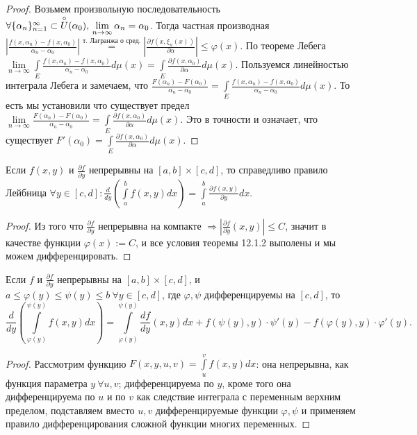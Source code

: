 \begin{proof}
	Возьмем произвольную последовательность $\forall\{\alpha_n\}_{n=1}^\infty\subset\overset{\circ}{U}(\alpha_0),\\ \lim\limits_{n\to\infty}\alpha_n=\alpha_0$. Тогда частная производная $\left|\frac{f(x,\alpha_n)-f(x,\alpha_0)}{\alpha_n-\alpha_0}\right|\overset{\text{т. Лагранжа о сред.}}{=}\left|\frac{\partial f(x,\xi_n(x))}{\partial\alpha}\right|\leqslant\varphi(x)$. По теореме Лебега $\lim\limits_{n\to\infty}\int\limits_E\frac{f(x,\alpha_n)-f(x,\alpha_0)}{\alpha_n-\alpha_0}d\mu(x)=\int\limits_E\frac{\partial f(x,\alpha_0)}{\partial\alpha}d\mu(x)$. Пользуемся линейностью интеграла Лебега и замечаем, что $\frac{F(\alpha_n)-F(\alpha_0)}{\alpha_n-\alpha_0}=\int\limits_E\frac{f(x,\alpha_n)-f(x,\alpha_0)}{\alpha_n-\alpha_0}d\mu(x)$. То есть мы установили что существует предел $\lim\limits_{n\to\infty}\frac{F(\alpha_n)-F(\alpha_0)}{\alpha_n-\alpha_0}=\int\limits_E\frac{\partial f(x,\alpha_0)}{\partial\alpha}d\mu(x)$. Это в точности и означает, что существует $F'(\alpha_0)=\int\limits_E\frac{\partial f(x,\alpha_0)}{\partial\alpha}d\mu(x)$.
\end{proof}
\begin{corollary}
Если $f(x,y)$ и $\frac{\partial f}{\partial y}$ непрерывны на $[a,b]\times[c,d]$, то справедливо правило Лейбница  $\forall y\in [c,d]:\frac{d}{dy}\left(\int\limits_a^bf(x,y)dx\right)=\int\limits_a^b\frac{\partial f(x,y)}{\partial y}dx$.
\begin{proof}
Из того что $\frac{\partial f}{\partial y}$ непрерывна на компакте $\Rightarrow \left|\frac{\partial f}{\partial y }(x,y)\right|\leqslant C$, значит в качестве функции $\varphi(x):=C$, и все условия теоремы 12.1.2 выполены и мы можем дифференцировать.
\end{proof}
\begin{corollary}[из следствия]
Если $f$ и $\frac{\partial f}{\partial y}$ непрерывны на $[a,b]\times[c,d]$, и $a\leqslant \varphi(y)\leqslant\psi(y)\leqslant b\  \forall y\in [c,d]$, где $\varphi, \psi$ дифференцируемы на $[c,d]$, то $$\frac{d}{dy}\left(\int\limits_{\varphi(y)}^{\psi(y)}f(x,y)dx\right)=\int\limits_{\varphi(y)}^{\psi(y)}\frac{df}{dy}(x,y)dx+f(\psi(y),y)\cdot\psi'(y)-f(\varphi(y),y)\cdot\varphi'(y).$$
\end{corollary}
\begin{proof}
Рассмотрим функцию $F(x,y,u,v)=\int\limits_u^v f(x,y)dx$: она  непрерывна, как функция параметра $y\ \forall u,v$; дифференцируема по $y$, кроме того она дифференцируема по $u$ и по $v$ как следствие интеграла с переменным верхним пределом, подставляем вместо $u,v$ дифференцируемые функции $\varphi, \psi$ и применяем правило дифференцирования сложной функции многих переменных.
\end{proof}
\end{corollary}


